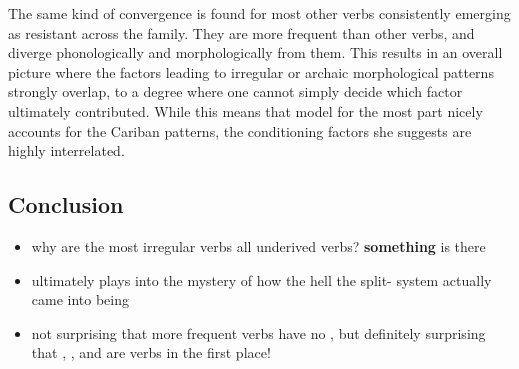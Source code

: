 The same kind of convergence is found for most other verbs consistently emerging as resistant across the family.
They are more frequent than other  verbs, and diverge phonologically and morphologically from them.
This results in an overall picture where the factors leading to irregular or archaic morphological patterns strongly overlap, to a degree where one cannot simply decide which factor ultimately contributed.
While this means that  model for the most part nicely accounts for the Cariban patterns, the conditioning factors she suggests are highly interrelated.

\subsection{Conclusion}

\begin{itemize}
	\item why are the most irregular verbs all underived  verbs? \textbf{something} is there
	\item ultimately plays into the mystery of how the hell the split- system actually came into being
	\item not surprising that more frequent  verbs have no , but definitely surprising that , , and  are  verbs in the first place!
\end{itemize}

